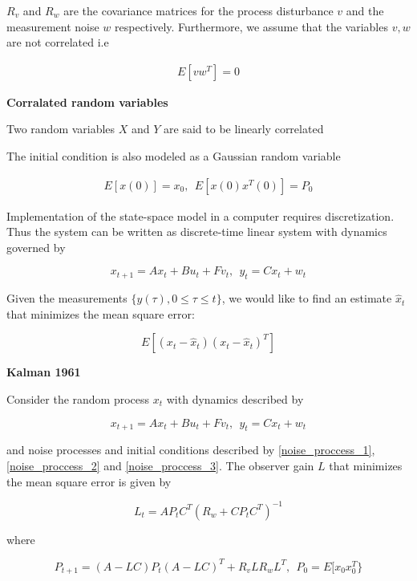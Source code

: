 $R_v$ and $R_w$ are the covariance matrices for the process disturbance $v$ and the measurement noise $w$ respectively. Furthermore, we assume that the variables $v, w$ are not correlated i.e 

\begin{eqnarray}
E[vw^T] = 0
\label{noise_proccess_2} 
\end{eqnarray}


\begin{framed}
\theoremstyle{remark}
\begin{remark}{\textbf{Corralated random variables}}

Two random variables $X$ and $Y$ are said to be linearly correlated 
\end{remark}
\end{framed}

The initial condition is also modeled as a Gaussian random variable

\begin{eqnarray}
E[x(0)] = x_0, ~~ E[x(0)x^{T}(0)] = P_0
\label{noise_proccess_3} 
\end{eqnarray}

Implementation of the state-space model in a computer requires discretization. Thus the system can be written as discrete-time linear system with dynamics governed by

\begin{equation}
x_{t+1} = Ax_t + Bu_t + Fv_t,  ~~ y_t = Cx_t + w_t 
\end{equation}

Given the measurements $\{y(\tau), 0 \leq \tau \leq t \}$, we would like to find an estimate $\hat{x}_t$ that minimizes the mean square error:

\begin{equation}
E[(x_t - \hat{x}_t)(x_t - \hat{x}_t)^T] 
\end{equation}

\begin{framed}
\theoremstyle{theorem}
\begin{theorem}{\textbf{Kalman 1961}}


Consider the random process $x_t$ with dynamics described by  

\begin{equation}
x_{t+1} = Ax_t + Bu_t + Fv_t,  ~~ y_t = Cx_t + w_t \nonumber
\end{equation} 

and noise processes and initial conditions described by \ref{noise_proccess_1},  \ref{noise_proccess_2} and 
\ref{noise_proccess_3}. The observer gain $L$ that minimizes the mean square error is given by  

\begin{equation}
L_t = AP_tC^T(R_w + CP_tC^T)^{-1}  \nonumber
\end{equation}

where

\begin{equation}
P_{t+1} =  (A − LC)P_t(A − LC)^T + R_v LR_w L^T, ~~ P_0 = E[x_0x^{T}_0\}
\end{equation}

\end{theorem}
\end{framed}

